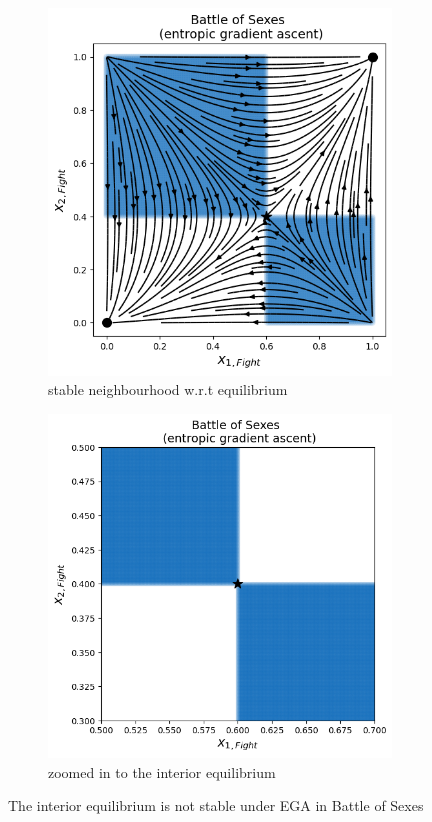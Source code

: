 \begin{figure}[H]
\captionsetup{justification=centering}
\centering
\begin{subfigure}{.5\textwidth}
    \centering
    \includegraphics[width=\textwidth]{logos/BattleOfSexes6.png}
    \caption{stable neighbourhood w.r.t equilibrium}
    \label{fig:BOS3a}
\end{subfigure}%
\begin{subfigure}{.5\textwidth}
    \centering
    \includegraphics[width=\textwidth]{logos/BattleOfSexes5.png}
    \caption{zoomed in to the interior equilibrium}
    \label{fig:BOS3b}
\end{subfigure}
\caption{The interior equilibrium is not stable under EGA in Battle of Sexes}
\label{fig:BOS3}
\end{figure}


